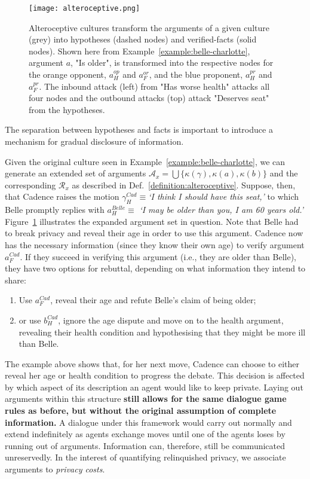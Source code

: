 \documentclass[acmsmall]{custom-arxiv}  %
\begin{document}
\begin{figure}
\texttt{[image: alteroceptive.png]}
\caption{Alteroceptive cultures transform the arguments of a given culture (grey) into  hypotheses (dashed nodes) and verified-facts (solid nodes). Shown here from Example~\ref{example:belle-charlotte}, argument $a$, "Is older", is transformed into the respective nodes for the orange opponent, $a_{H}^{op}$ and $a_{F}^{or}$, and the blue proponent, $a_{H}^{pr}$ and $a_{F}^{pr}$.
The inbound attack (left) from "Has worse health" attacks all four nodes and the outbound attacks (top) attack "Deserves seat" from the hypotheses.}
\label{fig:alteroceptive}
\end{figure}

The separation between hypotheses and facts is important to introduce a mechanism for gradual disclosure of information.

\begin{example} 
Given the original culture seen in Example~\ref{example:belle-charlotte}, we can generate an extended set of arguments $\mathcal{A}_x = \bigcup \{\kappa(\gamma), \kappa(a), \kappa(b)\}$ and the corresponding $\mathcal{R}_x$ as described in Def.~\ref{definition:alteroceptive}. Suppose, then, that Cadence raises the motion $\gamma_{H}^{\textit{Cad}} \equiv $\textit{`I think I should have this seat,'} to which Belle promptly replies with $a_{H}^{\textit{Belle}} \equiv $ \textit{`I may be older than you, I am 60 years old.'} Figure~\ref{fig:alteroceptive} illustrates the expanded argument set in question. Note that Belle had to break privacy and reveal their age in order to use this argument. Cadence now has the necessary information (since they know their own age) to verify argument $a_{F}^{\textit{Cad}}$. If they succeed in verifying this argument (i.e., they are older than Belle), they have two options for rebuttal, depending on what information they intend to share:
\begin{enumerate}
    \item Use $a_{F}^{\textit{Cad}}$, reveal their age and refute Belle's claim of being older;
    \item or use $b_{H}^{\textit{Cad}}$, ignore the age dispute and move on to the health argument, revealing their health condition and hypothesising that they might be more ill than Belle.
\end{enumerate}
\end{example}

The example above shows that, for her next move, Cadence can choose to either reveal her age or health condition to progress the debate. This decision is affected by which aspect of its description an agent would like to keep private. Laying out arguments within this structure \textbf{still allows for the same dialogue game rules as before, but without the original assumption of complete information.} A dialogue under this framework would carry out normally and extend indefinitely as agents exchange moves until one of the agents loses by running out of arguments. Information can, therefore, still be communicated unreservedly. In the interest of quantifying relinquished privacy, we associate arguments to \textit{privacy costs}.
\end{document}
